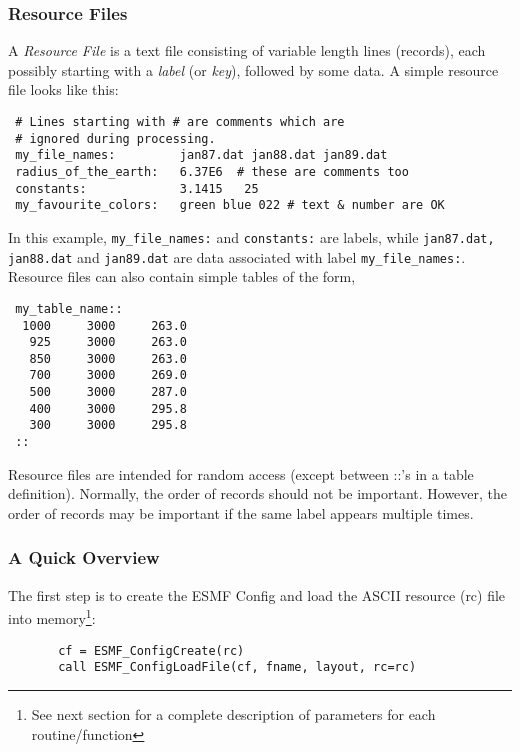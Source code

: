 
 \subsubsection{Resource Files}

      A {\em Resource File} is a text file consisting of variable
     length lines (records), each possibly starting with a {\em label}
     (or {\em key}), followed by some data. A simple resource file 
     looks like this:

 \begin{verbatim}
 # Lines starting with # are comments which are
 # ignored during processing.
 my_file_names:         jan87.dat jan88.dat jan89.dat
 radius_of_the_earth:   6.37E6  # these are comments too
 constants:             3.1415   25
 my_favourite_colors:   green blue 022 # text & number are OK
 \end{verbatim}

    In this example, {\tt my\_file\_names:} and {\tt constants:}
    are labels, while {\tt jan87.dat, jan88.dat} and {\tt jan89.dat} are
    data associated with label {\tt my\_file\_names:}.
    Resource files can also contain simple tables of the form,

 \begin{verbatim}
 my_table_name::
  1000     3000     263.0   
   925     3000     263.0
   850     3000     263.0
   700     3000     269.0
   500     3000     287.0
   400     3000     295.8
   300     3000     295.8    
 ::
 \end{verbatim}

 Resource files are intended for random access (except between ::'s in a 
 table definition). Normally, the order of records should not be important. 
 However, the order of records may be important if the same label appears 
 multiple times.

    \subsubsection{A Quick Overview}

    The first step is to create the ESMF Config and load the 
    ASCII resource (rc) file into memory\footnote{See next section 
    for a complete description of parameters for each routine/function}:

 \begin{verbatim}
       cf = ESMF_ConfigCreate(rc)
       call ESMF_ConfigLoadFile(cf, fname, layout, rc=rc)
 \end{verbatim}


